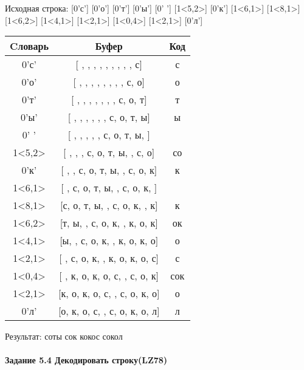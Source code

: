 \documentclass[a4paper, 12pt]{article}
\begin{document}
Исходная строка: [0'с'] [0'о'] [0'т'] [0'ы'] [0' '] [1<5,2>] [0'к'] [1<6,1>] [1<8,1>] [1<6,2>] [1<4,1>] [1<2,1>] [1<0,4>] [1<2,1>] [0'л']\\
\begin{table}[h!]
\centering
\begin{tabular}{|c|c|c|}
\hline
 Cловарь & Буфер & Код  \\ \hline
0'с' & [ ,  ,  ,  ,  ,  ,  ,  ,  , с] & с
\\ \hline
0'о' & [ ,  ,  ,  ,  ,  ,  ,  , с, о] & о
\\ \hline
0'т' & [ ,  ,  ,  ,  ,  ,  , с, о, т] & т
\\ \hline
0'ы' & [ ,  ,  ,  ,  ,  , с, о, т, ы] & ы
\\ \hline
0' ' & [ ,  ,  ,  ,  , с, о, т, ы,  ] &  
\\ \hline
1<5,2> & [ ,  ,  , с, о, т, ы,  , с, о] & со
\\ \hline
0'к' & [ ,  , с, о, т, ы,  , с, о, к] & к
\\ \hline
1<6,1> & [ , с, о, т, ы,  , с, о, к,  ] &  
\\ \hline
1<8,1> & [с, о, т, ы,  , с, о, к,  , к] & к
\\ \hline
1<6,2> & [т, ы,  , с, о, к,  , к, о, к] & ок
\\ \hline
1<4,1> & [ы,  , с, о, к,  , к, о, к, о] & о
\\ \hline
1<2,1> & [ , с, о, к,  , к, о, к, о, с] & с
\\ \hline
1<0,4> & [ , к, о, к, о, с,  , с, о, к] &  сок
\\ \hline
1<2,1> & [к, о, к, о, с,  , с, о, к, о] & о
\\ \hline
0'л' & [о, к, о, с,  , с, о, к, о, л] & л
\\ \hline
\end{tabular}
\end{table}

Результат: соты сок кокос сокол
\pagebreak
\paragraph{Задание 5.4 Декодировать строку(LZ78)\\}
\end{document}
